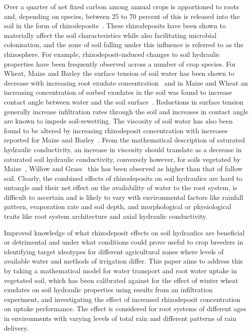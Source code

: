 \documentclass[11pt,a4paper]{article}
\numberwithin{equation}{section}
\begin{document}
Over a quarter of net fixed carbon among annual crops is apportioned to roots and, depending on species, between 25 to 70 percent of this is released into the soil in the form of rhizodeposits~\citep{mcgrail2020trait}. These rhizodeposits have been shown to materially affect the soil characteristics while also facilitating microbial colonisation, and the zone of soil falling under this influence is referred to as the rhizosphere. For example, rhizodeposit-induced changes to soil hydraulic properties have been frequently observed across a number of crop species. For Wheat, Maize and Barley the surface tension of soil water has been shown to decrease with increasing root exudate concentration~\citep{read1997surface, read2003plant, naveed2019surface} and in Maize and Wheat an increasing concentration of sorbed exudates in the soil was found to increase contact angle between water and the soil surface~\citep{ahmed2016drying, zickenrott2016efficient, benard2018pore, naveed2019surface}. Reductions in surface tension generally increase infiltration rates through the soil and increases in contact angle are known to impede soil-rewetting. The viscosity of soil water has also been found to be altered by increasing rhizodeposit concentration with increases reported for Maize and Barley~\citep{naveed2019surface}. From the mathematical description of saturated hydraulic conductivity, an increase in viscosity should translate as a decrease in saturated soil hydraulic conductivity, conversely however, for soils vegetated by Maize~\citep{feki2018influence}, Willow and Grass~\citep{leung2018plant} this has been observed as higher than that of fallow soil. Clearly, the combined effects of rhizodeposits on soil hydraulics are hard to untangle and their net effect on the availability of water to the root system, is difficult to ascertain and is likely to vary with environmental factors like rainfall pattern, evaporation rate and soil depth, and morphological or physiological traits like root system architecture and axial hydraulic conductivity. 

Improved knowledge of what rhizodeposit effects on soil hydraulics are beneficial or detrimental and under what conditions could prove useful to crop breeders in identifying target ideotypes for different agricultural zones where levels of available water and methods of irrigation differ. This paper aims to address this by taking a mathematical model for water transport and root water uptake in vegetated soil, which has been calibrated against for the effect of winter wheat exudates on soil hydraulic properties using results from an infiltration experiment, and investigating the effect of increased rhizodeposit concentration on uptake performance. The effect is considered for root systems of different ages in environments with varying levels of total rain and different patterns of rain delivery. 
\end{document}
